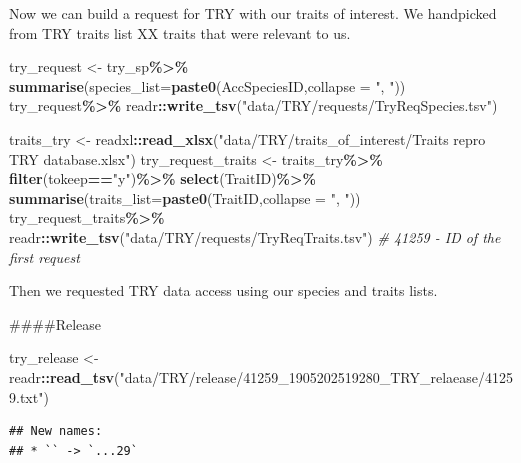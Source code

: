 \documentclass[
  12pt,
  american,
  a4paper,
  extrafontsizes,onecolumn,openright
  ]{memoir}
\newenvironment{Shaded}{\begin{snugshade}}{\end{snugshade}}
\newcommand{\AttributeTok}[1]{\textcolor[rgb]{0.13,0.29,0.53}{#1}}
\newcommand{\CommentTok}[1]{\textcolor[rgb]{0.56,0.35,0.01}{\textit{#1}}}
\newcommand{\FunctionTok}[1]{\textcolor[rgb]{0.13,0.29,0.53}{\textbf{#1}}}
\newcommand{\NormalTok}[1]{#1}
\newcommand{\OtherTok}[1]{\textcolor[rgb]{0.56,0.35,0.01}{#1}}
\newcommand{\SpecialCharTok}[1]{\textcolor[rgb]{0.81,0.36,0.00}{\textbf{#1}}}
\newcommand{\StringTok}[1]{\textcolor[rgb]{0.31,0.60,0.02}{#1}}
\begin{document}
Now we can build a request for TRY with our traits of interest.
We handpicked from TRY traits list XX traits that were relevant to us.

\begin{Shaded}
\begin{Highlighting}[]
\NormalTok{try\_request }\OtherTok{\textless{}{-}}\NormalTok{ try\_sp}\SpecialCharTok{\%\textgreater{}\%}
  \FunctionTok{summarise}\NormalTok{(}\AttributeTok{species\_list=}\FunctionTok{paste0}\NormalTok{(AccSpeciesID,}\AttributeTok{collapse =} \StringTok{", "}\NormalTok{))}
\NormalTok{try\_request}\SpecialCharTok{\%\textgreater{}\%}
\NormalTok{  readr}\SpecialCharTok{::}\FunctionTok{write\_tsv}\NormalTok{(}\StringTok{"data/TRY/requests/TryReqSpecies.tsv"}\NormalTok{)}

\NormalTok{traits\_try }\OtherTok{\textless{}{-}}\NormalTok{ readxl}\SpecialCharTok{::}\FunctionTok{read\_xlsx}\NormalTok{(}\StringTok{"data/TRY/traits\_of\_interest/Traits repro TRY database.xlsx"}\NormalTok{)}
\NormalTok{try\_request\_traits }\OtherTok{\textless{}{-}}\NormalTok{ traits\_try}\SpecialCharTok{\%\textgreater{}\%}
  \FunctionTok{filter}\NormalTok{(tokeep}\SpecialCharTok{==}\StringTok{"y"}\NormalTok{)}\SpecialCharTok{\%\textgreater{}\%}
  \FunctionTok{select}\NormalTok{(TraitID)}\SpecialCharTok{\%\textgreater{}\%}
  \FunctionTok{summarise}\NormalTok{(}\AttributeTok{traits\_list=}\FunctionTok{paste0}\NormalTok{(TraitID,}\AttributeTok{collapse =} \StringTok{", "}\NormalTok{))}
\NormalTok{try\_request\_traits}\SpecialCharTok{\%\textgreater{}\%}
\NormalTok{  readr}\SpecialCharTok{::}\FunctionTok{write\_tsv}\NormalTok{(}\StringTok{"data/TRY/requests/TryReqTraits.tsv"}\NormalTok{)}
\CommentTok{\# 41259 {-} ID of the first request}
\end{Highlighting}
\end{Shaded}

Then we requested TRY data access using our species and traits lists.

\#\#\#\#Release

\begin{Shaded}
\begin{Highlighting}[]
\NormalTok{try\_release }\OtherTok{\textless{}{-}}\NormalTok{ readr}\SpecialCharTok{::}\FunctionTok{read\_tsv}\NormalTok{(}\StringTok{"data/TRY/release/41259\_1905202519280\_TRY\_relaease/41259.txt"}\NormalTok{)}
\end{Highlighting}
\end{Shaded}

\begin{verbatim}
## New names:
## * `` -> `...29`
\end{verbatim}
\end{document}
